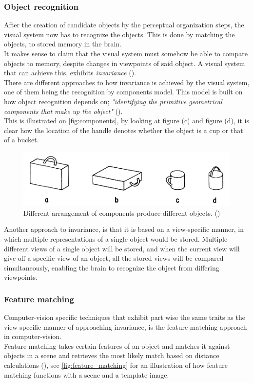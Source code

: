 \documentclass{article}
\newcommand{\goodcite}[1]{ {(\cite{#1})}}
\begin{document}
\subsubsection{Object recognition}
After the creation of candidate objects by the perceptual organization steps, the visual system now has to recognize the objects. This is done by matching the objects, to stored memory in the brain.\\

It makes sense to claim that the visual system must somehow be able to compare objects to memory, despite changes in viewpoints of said object. A visual system that can achieve this, exhibits \textit{invariance}\goodcite{hsp}.\\There are different approaches to how invariance is achieved by the visual system, one of them being the recognition by components model. This model is built on how object recognition depends on; \textit{"identifying the primitive geometrical components that make up the object"}\goodcite{hsp}.\\This is illustrated on \autoref{fig:components}, by looking at figure (c) and figure (d), it is clear how the location of the handle denotes whether the object is a cup or that of a bucket.

\begin{figure}[H]
    \centering
    \includegraphics[width=\textwidth]{img/comps.png}
    \caption{Different arrangement of components produce different objects.\goodcite{bieder}}
    \label{fig:components}
\end{figure}

Another approach to invariance, is that it is based on a view-specific manner, in which multiple representations of a single object would be stored. Multiple different views of a single object will be stored, and when the current view will give off a specific view of an object, all the stored views will be compared simultaneously, enabling the brain to recognize the object from differing viewpoints.\medskip \\

\subsubsection{Feature matching}
Computer-vision specific techniques that exhibit part wise the same traits as the view-specific manner of approaching invariance, is the feature matching approach in computer-vision.\\Feature matching takes certain features of an object and matches it against objects in a scene and retrieves the most likely match based on distance calculations\goodcite{OpenCV}, see \autoref{fig:feature_matching} for an illustration of how feature matching functions with a scene and a template image.\medskip \\
\end{document}
